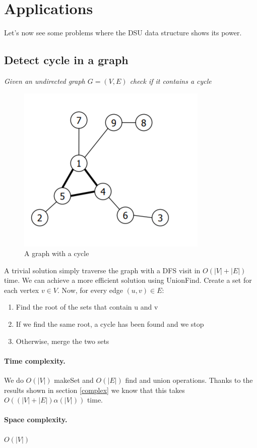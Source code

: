 \documentclass{article}
\begin{document}
\section{Applications}
Let's now see some problems where the DSU data structure shows its power.
\subsection{Detect cycle in a graph} \label{loop}
\emph{Given an undirected graph $G = (V, E)$ check if it contains a cycle}
\begin{figure}[h!]
    \centering
    \includegraphics[scale=0.5]{img/cycle.png}
    \caption{A graph with a cycle}
\end{figure}
\bigskip

A trivial solution simply traverse the graph with a DFS visit in $O(|V| + |E|)$
time. We can achieve a more efficient solution using UnionFind. Create a set for each
vertex $v \in V$. Now, for every edge $ (u,v) \in E$:\begin{enumerate}
    \item Find the root  of the sets that contain u and v
    \item If we find  the same root, a cycle has been found and we stop 
    \item Otherwise, merge the two sets
\end{enumerate}

\paragraph{Time complexity.} We do $O(|V|)$ makeSet  and  $O(|E|)$ find and  union operations.
Thanks  to the results shown in section \ref{complex} we know that this takes $O((|V| + |E|)\alpha(|V|))$ time. 
\paragraph{Space complexity.} $O(|V|)$

\end{document}
